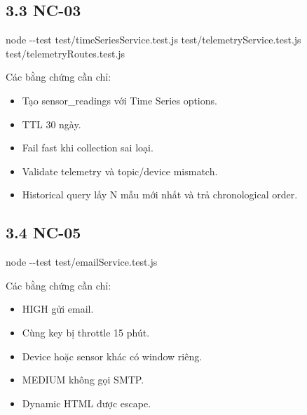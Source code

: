 \documentclass[11pt,oneside,openany]{book}
\renewcommand{\texttt}[1]{{\ttfamily\small #1}}
\newenvironment{Shaded}{\begin{snugshade}}{\end{snugshade}}
\newcommand{\FunctionTok}[1]{\textcolor[rgb]{0.56,0.27,0.68}{#1}}
\newcommand{\NormalTok}[1]{\textcolor[rgb]{0.81,0.81,0.76}{#1}}
\newcommand{\OperatorTok}[1]{\textcolor[rgb]{0.81,0.81,0.76}{#1}}
\renewenvironment{Shaded}{%
  \def\FrameCommand{\fboxsep=8pt\colorbox{shadecolor}}%
  \MakeFramed{\advance\hsize-\width\FrameRestore}%
}{\endMakeFramed}
\providecommand{\tightlist}{\setlength{\itemsep}{1pt}\setlength{\parskip}{0pt}}
\begin{document}
\subsection{3.3 NC-03}\label{33-nc-03}

\begin{Shaded}
\begin{Highlighting}[]
\NormalTok{node }\OperatorTok{{-}{-}}\NormalTok{test test}\OperatorTok{/}\NormalTok{timeSeriesService}\OperatorTok{.}\FunctionTok{test}\OperatorTok{.}\FunctionTok{js}\NormalTok{ test}\OperatorTok{/}\NormalTok{telemetryService}\OperatorTok{.}\FunctionTok{test}\OperatorTok{.}\FunctionTok{js}\NormalTok{ test}\OperatorTok{/}\NormalTok{telemetryRoutes}\OperatorTok{.}\FunctionTok{test}\OperatorTok{.}\FunctionTok{js}
\end{Highlighting}
\end{Shaded}

Các bằng chứng cần chỉ:

\begin{itemize}
\tightlist
\item
  Tạo \texttt{sensor\_readings} với Time Series options.
\item
  TTL 30 ngày.
\item
  Fail fast khi collection sai loại.
\item
  Validate telemetry và topic/device mismatch.
\item
  Historical query lấy N mẫu mới nhất và trả chronological order.
\end{itemize}

\subsection{3.4 NC-05}\label{34-nc-05}

\begin{Shaded}
\begin{Highlighting}[]
\NormalTok{node }\OperatorTok{{-}{-}}\NormalTok{test test}\OperatorTok{/}\NormalTok{emailService}\OperatorTok{.}\FunctionTok{test}\OperatorTok{.}\FunctionTok{js}
\end{Highlighting}
\end{Shaded}

Các bằng chứng cần chỉ:

\begin{itemize}
\tightlist
\item
  HIGH gửi email.
\item
  Cùng key bị throttle 15 phút.
\item
  Device hoặc sensor khác có window riêng.
\item
  MEDIUM không gọi SMTP.
\item
  Dynamic HTML được escape.
\end{itemize}
\end{document}
